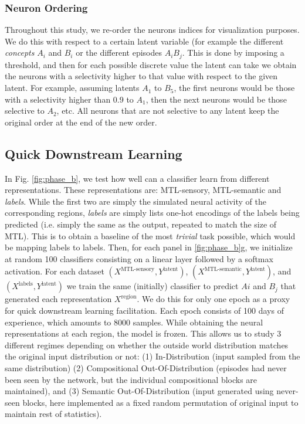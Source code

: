 \documentclass{article}
\begin{document}
\subsubsection*{Neuron Ordering}
Throughout this study, we re-order the neurons indices for visualization purposes. We do this with respect to a certain latent variable (for example the different \textit{concepts} $A_i$ and $B_i$ or the different episodes $A_iB_j$. This is done by imposing a threshold, and then for each possible discrete value the latent can take we obtain the neurons with a selectivity higher to that value with respect to the given latent. For example, assuming latents $A_1$ to $B_5$, the first neurons would be those with a selectivity higher than 0.9 to $A_1$, then the next neurons would be those selective to $A_2$, etc. All neurons that are not selective to any latent keep the original order at the end of the new order.
\subsection*{Quick Downstream Learning}
In Fig. \ref{fig:phase_b}, we test how well can a classifier learn from different representations. These representations are: MTL-sensory, MTL-semantic and \textit{labels}. While the first two are simply the simulated neural activity of the corresponding regions, \textit{labels} are simply lists one-hot encodings of the labels being predicted (i.e. simply the same as the output, repeated to match the size of MTL). This is to obtain a baseline of the most \textit{trivial} task possible, which would be mapping labels to labels. Then, for each panel in \ref{fig:phase_b}g, we initialize at random 100 classifiers consisting on a linear layer followed by a softmax activation. For each dataset $(X^\textrm{MTL-sensory}, Y^\textrm{latent})$, $(X^\textrm{MTL-semantic}, Y^\textrm{latent})$, and $(X^\textrm{labels}, Y^\textrm{latent})$ we train the same (initially) classifier to predict $Ai$ and $B_j$ that generated each representation $X^\textrm{region}$. We do this for only one epoch as a proxy for quick downstream learning facilitation. Each epoch consists of 100 days of experience, which amounts to 8000 samples.
\newline\newline
While obtaining the neural representations at each region, the model is frozen. This allows us to study 3 different regimes depending on whether the outside world distribution matches the original input distribution or not: (1) In-Distribution (input sampled from the same distribution) (2) Compositional Out-Of-Distribution (episodes had never been seen by the network, but the individual compositional blocks are maintained), and (3) Semantic Out-Of-Distribution (input generated using never-seen blocks, here implemented as a fixed random permutation of original input to maintain rest of statistics).  
\end{document}
